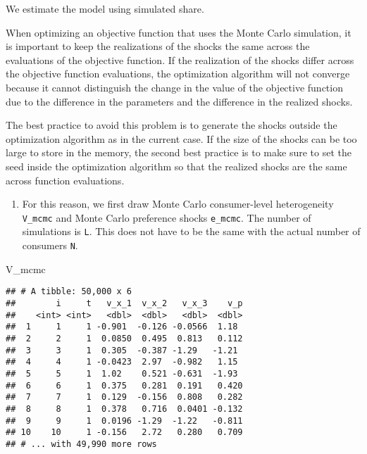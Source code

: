 \documentclass[
]{book}
\newenvironment{Shaded}{\begin{snugshade}}{\end{snugshade}}
\newcommand{\NormalTok}[1]{#1}
\providecommand{\tightlist}{%
  \setlength{\itemsep}{0pt}\setlength{\parskip}{0pt}}
\begin{document}
We estimate the model using simulated share.

When optimizing an objective function that uses the Monte Carlo simulation, it is important to keep the realizations of the shocks the same across the evaluations of the objective function. If the realization of the shocks differ across the objective function evaluations, the optimization algorithm will not converge because it cannot distinguish the change in the value of the objective function due to the difference in the parameters and the difference in the realized shocks.

The best practice to avoid this problem is to generate the shocks outside the optimization algorithm as in the current case. If the size of the shocks can be too large to store in the memory, the second best practice is to make sure to set the seed inside the optimization algorithm so that the realized shocks are the same across function evaluations.

\begin{enumerate}
\def\labelenumi{\arabic{enumi}.}
\setcounter{enumi}{1}
\tightlist
\item
  For this reason, we first draw Monte Carlo consumer-level heterogeneity \texttt{V\_mcmc} and Monte Carlo preference shocks \texttt{e\_mcmc}. The number of simulations is \texttt{L}. This does not have to be the same with the actual number of consumers \texttt{N}.
\end{enumerate}

\begin{Shaded}
\begin{Highlighting}[]
\NormalTok{V_mcmc}
\end{Highlighting}
\end{Shaded}

\begin{verbatim}
## # A tibble: 50,000 x 6
##        i     t   v_x_1  v_x_2   v_x_3    v_p
##    <int> <int>   <dbl>  <dbl>   <dbl>  <dbl>
##  1     1     1 -0.901  -0.126 -0.0566  1.18 
##  2     2     1  0.0850  0.495  0.813   0.112
##  3     3     1  0.305  -0.387 -1.29   -1.21 
##  4     4     1 -0.0423  2.97  -0.982   1.15 
##  5     5     1  1.02    0.521 -0.631  -1.93 
##  6     6     1  0.375   0.281  0.191   0.420
##  7     7     1  0.129  -0.156  0.808   0.282
##  8     8     1  0.378   0.716  0.0401 -0.132
##  9     9     1  0.0196 -1.29  -1.22   -0.811
## 10    10     1 -0.156   2.72   0.280   0.709
## # ... with 49,990 more rows
\end{verbatim}
\end{document}
